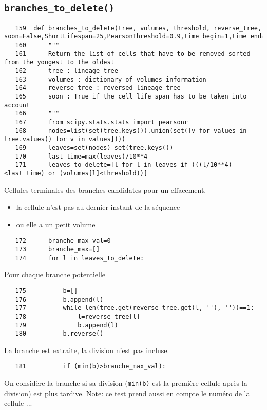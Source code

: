 \documentclass{article}
\def \mycolor {red}
\begin{document}
\subsection{\texttt{branches\_to\_delete()}}
\label{sec:branches:to:delete}
\begin{verbatim} 
   159	def branches_to_delete(tree, volumes, threshold, reverse_tree, soon=False,ShortLifespan=25,PearsonThreshold=0.9,time_begin=1,time_end=192):
   160	    """
   161	    Return the list of cells that have to be removed sorted from the yougest to the oldest
   162	    tree : lineage tree
   163	    volumes : dictionary of volumes information
   164	    reverse_tree : reversed lineage tree
   165	    soon : True if the cell life span has to be taken into account
   166	    """
   167	    from scipy.stats.stats import pearsonr
   168	    nodes=list(set(tree.keys()).union(set([v for values in tree.values() for v in values])))
   169	    leaves=set(nodes)-set(tree.keys())
   170	    last_time=max(leaves)/10**4
   171	    leaves_to_delete=[l for l in leaves if (((l/10**4)<last_time) or (volumes[l]<threshold))]
\end{verbatim} 
\color{\mycolor}
Cellules terminales des branches candidates pour un effacement.
\begin{itemize}
\item la cellule n'est pas au dernier instant de la s\'equence
\item ou elle a un petit volume
\end{itemize}
\color{black}
\begin{verbatim}
   172	    branche_max_val=0
   173	    branche_max=[]
   174	    for l in leaves_to_delete:
\end{verbatim} 
\color{\mycolor}
Pour chaque branche potentielle
\color{black}
\begin{verbatim}
   175	        b=[]
   176	        b.append(l)
   177	        while len(tree.get(reverse_tree.get(l, ''), ''))==1:
   178	            l=reverse_tree[l]
   179	            b.append(l)
   180	        b.reverse()
\end{verbatim} 
\color{\mycolor}
La branche est extraite, la division n'est pas incluse.
\color{black}
\begin{verbatim}
   181	        if (min(b)>branche_max_val):
\end{verbatim} 
\color{\mycolor}
On consid\`ere la branche si sa division (\verb|min(b)| est la premi\`ere cellule apr\`es la division) est plus tardive. Note: ce test prend aussi en compte le num\'ero de la cellule ...
\color{black}
\end{document}
